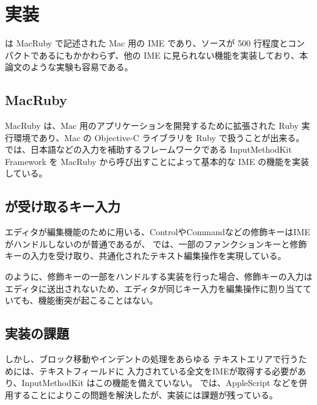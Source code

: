\section{実装}
{\system} は MacRuby で記述された Mac 用の IME であり、ソースが 500 行程度とコンパクトであるにもかかわらず、他の IME に見られない機能を実装しており、本論文のような実験も容易である。

\subsection{MacRuby}
MacRuby は、Mac 用のアプリケーションを開発するために拡張された Ruby 実行環境であり、Mac の Objective-C ライブラリを Ruby で扱うことが出来る。
{\system} では、日本語などの入力を補助するフレームワークである InputMethodKit Framework を MacRuby から呼び出すことによって基本的な IME の機能を実装している。

\subsection{{\system}が受け取るキー入力}
エディタが編集機能のために用いる、ControlやCommandなどの修飾キーはIMEがハンドルしないのが普通であるが、
{\system}では、一部のファンクションキーと修飾キーの入力を受け取り、共通化されたテキスト編集操作を実現している。

{\system} のように、修飾キーの一部をハンドルする実装を行った場合、修飾キーの入力はエディタに送出されないため、エディタが同じキー入力を編集操作に割り当てていても、機能衝突が起こることはない。

\subsection{実装の課題}
しかし、ブロック移動やインデントの処理をあらゆる テキストエリアで行うためには、テキストフィールドに 入力されている全文をIMEが取得する必要があり、InputMethodKit はこの機能を備えていない。{\system} では、AppleScript などを併用することによりこの問題を解決したが、実装には課題が残っている。
